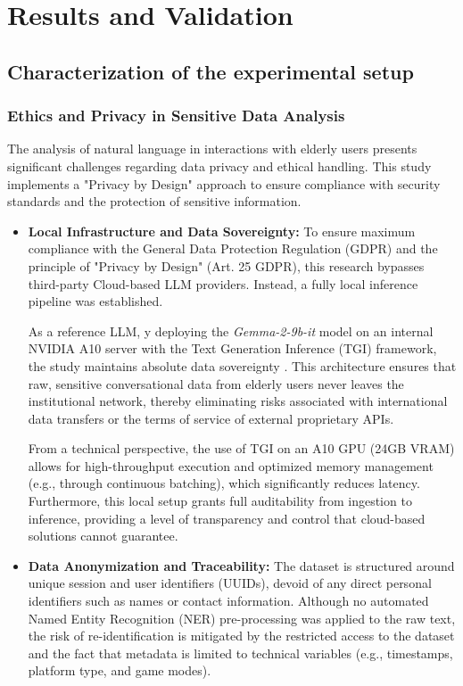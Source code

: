\section{Results and Validation}

\subsection{Characterization of the experimental setup}

\subsubsection{Ethics and Privacy in Sensitive Data Analysis}

    The analysis of natural language in interactions with elderly users presents significant challenges regarding data privacy and ethical handling. This study implements a "Privacy by Design" approach to ensure compliance with security standards and the protection of sensitive information.

\begin{itemize}
    \item \textbf{Local Infrastructure and Data Sovereignty:} To ensure maximum compliance with the General Data Protection Regulation (\gls{GDPR}) and the principle of "Privacy by Design" (Art. 25 GDPR), this research bypasses third-party Cloud-based LLM providers. Instead, a fully local inference pipeline was established. 
    
    As a reference LLM, y deploying the \textit{Gemma-2-9b-it} model on an internal NVIDIA A10 server with the Text Generation Inference (TGI) framework, the study maintains absolute data sovereignty \cite{Grandury2025}. This architecture ensures that raw, sensitive conversational data from elderly users never leaves the institutional network, thereby eliminating risks associated with international data transfers or the terms of service of external proprietary APIs. 
    
    From a technical perspective, the use of TGI on an A10 GPU (24GB VRAM) allows for high-throughput execution and optimized memory management (e.g., through continuous batching), which significantly reduces latency. Furthermore, this local setup grants full auditability from ingestion to \gls{inference}, providing a level of transparency and control that cloud-based solutions cannot guarantee.
    
    \item \textbf{Data Anonymization and Traceability:} The dataset is structured around unique session and user identifiers (UUIDs), devoid of any direct personal identifiers such as names or contact information. Although no automated Named Entity Recognition (NER) pre-processing was applied to the raw text, the risk of re-identification is mitigated by the restricted access to the dataset and the fact that metadata is limited to technical variables (e.g., timestamps, platform type, and game modes).
    
\end{itemize}

